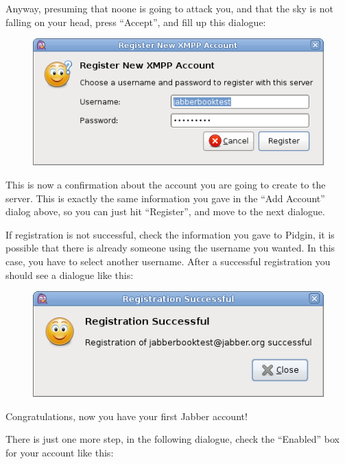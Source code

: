 Anyway, presuming that noone is going to attack you, and that the sky is not
falling on your head, press ``Accept'', and f\hbox{}ill up this dialogue:

\begin{figure}
    \includegraphics[scale=0.40]{./media/jabber_pidgin_register_new_xmpp_account}
\end{figure}

This is now a conf\hbox{}irmation about the account you are going to create to
the server. This is exactly the same information you gave in the ``Add Account''
dialog above, so you can just hit ``Register'', and move to the next dialogue.

If registration is not successful, check the information you gave to Pidgin, it
is possible that there is already someone using the username you wanted. In this
case, you have to select another username. After a successful registration you
should see a dialogue like this:

\begin{figure}
    \includegraphics[scale=0.40]{./media/jabber_pidgin_registration_successful}
\end{figure}

Congratulations, now you have your f\hbox{}irst Jabber account!
	
There is just one more step, in the following dialogue, check the ``Enabled''
box for your account like this:

